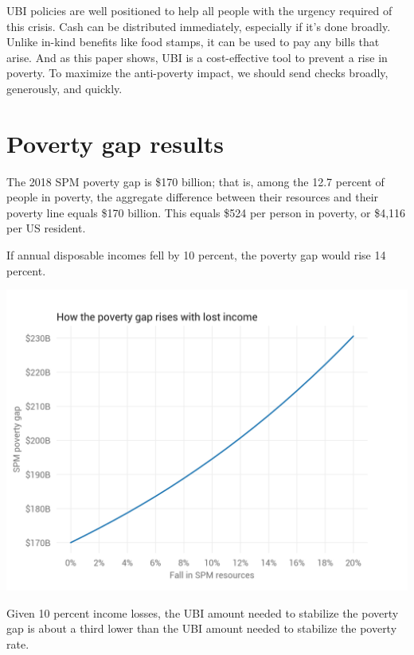 \documentclass[12pt]{article}
\begin{document}
UBI policies are well positioned to help all people with the urgency required of this crisis. Cash can be distributed immediately, especially if it's done broadly. Unlike in-kind benefits like food stamps, it can be used to pay any bills that arise. And as this paper shows, UBI is a cost-effective tool to prevent a rise in poverty. To maximize the anti-poverty impact, we should send checks broadly, generously, and quickly.

\appendix
\section{Poverty gap results} \label{sec:appendixa}

The 2018 SPM poverty gap is \$170 billion; that is, among the 12.7 percent of people in poverty, the aggregate difference between their resources and their poverty line equals \$170 billion. This equals \$524 per person in poverty, or \$4,116 per US resident.

If annual disposable incomes fell by 10 percent, the poverty gap would rise 14 percent.

\begin{center}
\includegraphics[width=15cm]{pov_gap_income.png}
\label{fig:pov_gap_income}
\end{center}

Given 10 percent income losses, the UBI amount needed to stabilize the poverty gap is about a third lower than the UBI amount needed to stabilize the poverty rate.
\end{document}
